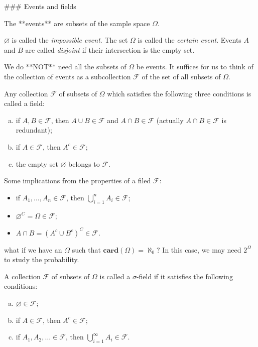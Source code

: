 ### Events and fields
\begin{definition}
The **events** are subsets of the sample space $\Omega$. 
\end{definition}

\begin{remark}
$\varnothing$ is called the \emph{impossible event}. The set $\Omega$ is called the \emph{certain event}. Events $A$ and $B$ are called \emph{disjoint} if their intersection is the empty set.
\end{remark}

We do **NOT** need all the subsets of $\Omega$ be events. It suffices for us to think of the collection of events as a subcollection $\mathcal{F}$ of the set of all subsets of $\Omega$.
\begin{definition}
Any collection $\mathcal{F}$ of subsets of $\Omega$ which satisfies the following three conditions is called a field:
\begin{enumerate}[(a)]
    \item if $A, B \in \mathcal{F}$, then $A \cup B \in \mathcal{F}$ and $A \cap B \in \mathcal{F}$ (actually $A\cap B \in \mathcal{F}$ is redundant); 
    \item if $A \in \mathcal{F}$, then $A^c \in \mathcal{F}$;
    \item the empty set $\varnothing$ belongs to $\mathcal{F}$.
\end{enumerate}
\end{definition}

\begin{remark}
Some implications from the properties of a filed $\mathcal{F}$:
\begin{itemize}
    \item if $A_1, \dots, A_n \in \mathcal{F}$, then $\bigcup_{i=1}^n A_i \in \mathcal{F}$;
    \item $\varnothing^C = \Omega \in \mathcal{F}$;
    \item $A \cap B = (A^c \cup B^c)^C \in \mathcal{F}$.
\end{itemize}
\end{remark}

\begin{question}
what if we have an $\Omega$ such that $\mathbf{card}(\Omega) = \aleph_0$? In this case, we may need $2^\Omega$ to study the probability. 
\end{question}

\begin{definition}
A collection $\mathcal{F}$ of subsets of $\Omega$ is called a $\sigma$-field if it satisfies the following conditions: 
\begin{enumerate}[(a)]
    \item $\varnothing \in \mathcal{F}$;
    \item if $A \in \mathcal{F}$, then $A^c \in \mathcal{F}$;
    \item if $A_1, A_2, \dots \in \mathcal{F}$, then $\bigcup_{i=1}^\infty A_i \in \mathcal{F}$.
\end{enumerate}
\end{definition}


